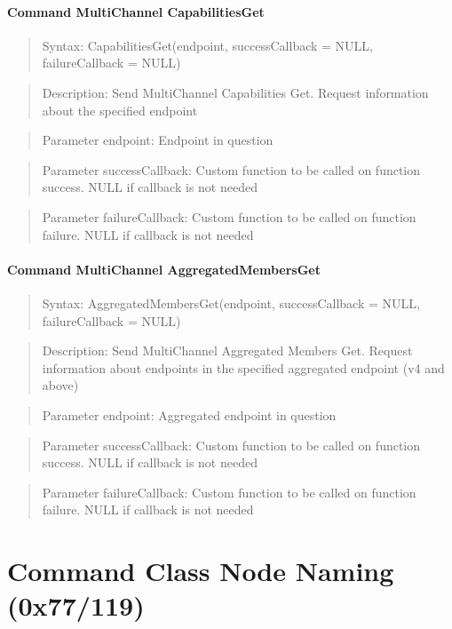 \paragraph{Command MultiChannel CapabilitiesGet}
\begin{quote}Syntax: CapabilitiesGet(endpoint, successCallback = NULL, failureCallback = NULL)\end{quote}
\begin{quote}Description: Send MultiChannel Capabilities Get. Request information about the specified endpoint\end{quote}
\begin{quote}Parameter endpoint: Endpoint in question\end{quote}
\begin{quote}Parameter successCallback: Custom function to be called on function success. NULL if callback is not needed\end{quote}
\begin{quote}Parameter failureCallback: Custom function to be called on function failure. NULL if callback is not needed\end{quote}


\paragraph{Command MultiChannel AggregatedMembersGet}
\begin{quote}Syntax: AggregatedMembersGet(endpoint, successCallback = NULL, failureCallback = NULL)\end{quote}
\begin{quote}Description: Send MultiChannel Aggregated Members Get. Request information about endpoints in the specified aggregated endpoint (v4 and above)\end{quote}
\begin{quote}Parameter endpoint: Aggregated endpoint in question\end{quote}
\begin{quote}Parameter successCallback: Custom function to be called on function success. NULL if callback is not needed\end{quote}
\begin{quote}Parameter failureCallback: Custom function to be called on function failure. NULL if callback is not needed\end{quote}



\section{Command Class Node Naming (0x77/119)}

